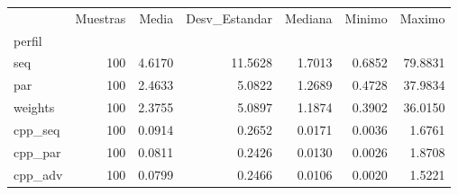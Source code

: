 \begin{tabular}{lrrrrrr}
\toprule
 & Muestras & Media & Desv_Estandar & Mediana & Minimo & Maximo \\
perfil &  &  &  &  &  &  \\
\midrule
seq & 100 & 4.6170 & 11.5628 & 1.7013 & 0.6852 & 79.8831 \\
par & 100 & 2.4633 & 5.0822 & 1.2689 & 0.4728 & 37.9834 \\
weights & 100 & 2.3755 & 5.0897 & 1.1874 & 0.3902 & 36.0150 \\
cpp_seq & 100 & 0.0914 & 0.2652 & 0.0171 & 0.0036 & 1.6761 \\
cpp_par & 100 & 0.0811 & 0.2426 & 0.0130 & 0.0026 & 1.8708 \\
cpp_adv & 100 & 0.0799 & 0.2466 & 0.0106 & 0.0020 & 1.5221 \\
\bottomrule
\end{tabular}
